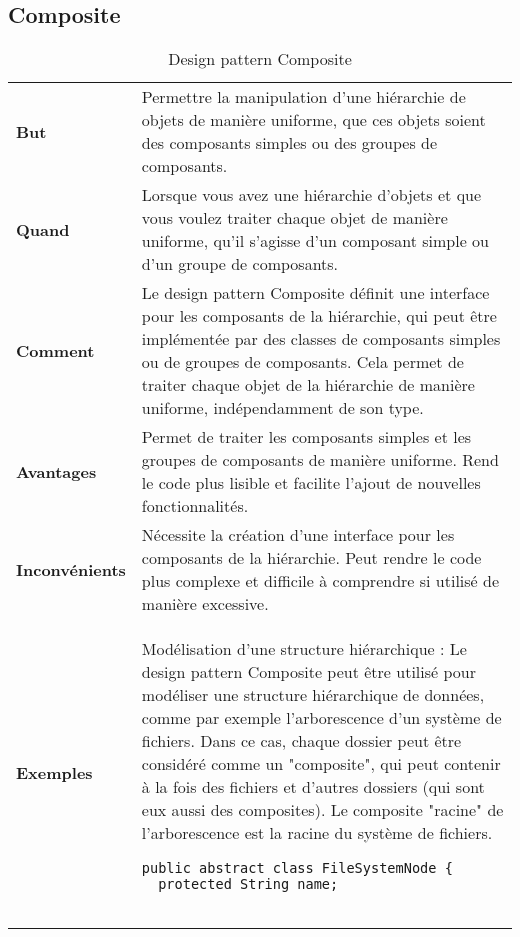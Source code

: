 \subsection{Composite}\label{subsec:composite}
\begin{definition}
\end{definition}
\begin{table}[H]
\caption{Design pattern Composite}
\label{tbl:design_patterns_composite}
\begin{adjustbox}{max width=\textwidth}
\begin{tabular}{l|p{\textwidth}}
\toprule
\textbf{But} & Permettre la manipulation d'une hiérarchie de objets de manière uniforme, que ces objets soient des composants simples ou des groupes de composants.\\
\cmidrule(lr){1-2}
\textbf{Quand} & Lorsque vous avez une hiérarchie d'objets et que vous voulez traiter chaque objet de manière uniforme, qu'il s'agisse d'un composant simple ou d'un groupe de composants.\\
\cmidrule(lr){1-2}
\textbf{Comment} & Le design pattern Composite définit une interface pour les composants de la hiérarchie, qui peut être implémentée par des classes de composants simples ou de groupes de composants. Cela permet de traiter chaque objet de la hiérarchie de manière uniforme, indépendamment de son type.\\
\cmidrule(lr){1-2}
\textbf{Avantages} & Permet de traiter les composants simples et les groupes de composants de manière uniforme. Rend le code plus lisible et facilite l'ajout de nouvelles fonctionnalités.\\
\cmidrule(lr){1-2}
\textbf{Inconvénients} & Nécessite la création d'une interface pour les composants de la hiérarchie. Peut rendre le code plus complexe et difficile à comprendre si utilisé de manière excessive.\\
\cmidrule(lr){1-2}
\multirow{2}{*}{\textbf{Exemples}} & 
\hspace{4mm}
\begin{minipage}[tl]{0.5\textwidth}
\begin{minipage}[t]{1\textwidth}
Modélisation d'une structure hiérarchique :
Le design pattern Composite peut être utilisé pour modéliser une structure hiérarchique de données, comme par exemple l'arborescence d'un système de fichiers. Dans ce cas, chaque dossier peut être considéré comme un "composite", qui peut contenir à la fois des fichiers et d'autres dossiers (qui sont eux aussi des composites). Le composite "racine" de l'arborescence est la racine du système de fichiers. 
\end{minipage}
\begin{minipage}[b]{1\textwidth}
\begin{lstlisting}[style=monstyle]
public abstract class FileSystemNode {
  protected String name;


\end{lstlisting}
\end{minipage}
\end{minipage}
\end{tabular}
\end{adjustbox}
\end{table}
